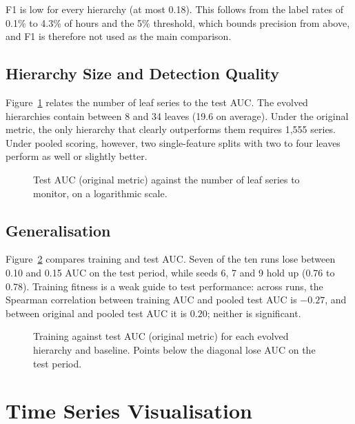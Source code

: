 F1 is low for every hierarchy (at most 0.18).
This follows from the label rates of 0.1\% to 4.3\% of hours and the 5\% threshold, which bounds precision from above, and F1 is therefore not used as the main comparison.

\subsection{Hierarchy Size and Detection Quality}

Figure~\ref{fig:leaves-auc} relates the number of leaf series to the test \ac{AUC}.
The evolved hierarchies contain between 8 and 34 leaves (19.6 on average).
Under the original metric, the only hierarchy that clearly outperforms them requires 1{,}555 series.
Under pooled scoring, however, two single-feature splits with two to four leaves perform as well or slightly better.

\begin{figure}[htbp]
    \centering
    \caption[Test AUC against number of leaf series]{Test \ac{AUC} (original metric) against the number of leaf series to monitor, on a logarithmic scale.}
    \label{fig:leaves-auc}
\end{figure}

\subsection{Generalisation}

Figure~\ref{fig:train-test} compares training and test \ac{AUC}.
Seven of the ten runs lose between 0.10 and 0.15 \ac{AUC} on the test period, while seeds 6, 7 and 9 hold up (0.76 to 0.78).
Training fitness is a weak guide to test performance: across runs, the Spearman correlation between training \ac{AUC} and pooled test \ac{AUC} is $-0.27$, and between original and pooled test \ac{AUC} it is $0.20$; neither is significant.

\begin{figure}[htbp]
    \centering
    \caption[Train vs test AUC]{Training against test \ac{AUC} (original metric) for each evolved hierarchy and baseline. Points below the diagonal lose \ac{AUC} on the test period.}
    \label{fig:train-test}
\end{figure}

\section{Time Series Visualisation}
\label{sec:ts-visualisation}

